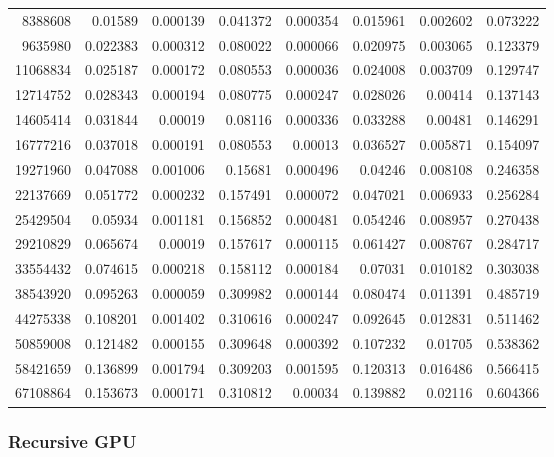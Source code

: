 \begin{longtable}{r r r r r r r r}
8388608 & 0.01589 & 0.000139 & 0.041372 & 0.000354 & 0.015961 & 0.002602 & 0.073222 \\
9635980 & 0.022383 & 0.000312 & 0.080022 & 0.000066 & 0.020975 & 0.003065 & 0.123379 \\
11068834 & 0.025187 & 0.000172 & 0.080553 & 0.000036 & 0.024008 & 0.003709 & 0.129747 \\
12714752 & 0.028343 & 0.000194 & 0.080775 & 0.000247 & 0.028026 & 0.00414 & 0.137143 \\
14605414 & 0.031844 & 0.00019 & 0.08116 & 0.000336 & 0.033288 & 0.00481 & 0.146291 \\
16777216 & 0.037018 & 0.000191 & 0.080553 & 0.00013 & 0.036527 & 0.005871 & 0.154097 \\
19271960 & 0.047088 & 0.001006 & 0.15681 & 0.000496 & 0.04246 & 0.008108 & 0.246358 \\
22137669 & 0.051772 & 0.000232 & 0.157491 & 0.000072 & 0.047021 & 0.006933 & 0.256284 \\
25429504 & 0.05934 & 0.001181 & 0.156852 & 0.000481 & 0.054246 & 0.008957 & 0.270438 \\
29210829 & 0.065674 & 0.00019 & 0.157617 & 0.000115 & 0.061427 & 0.008767 & 0.284717 \\
33554432 & 0.074615 & 0.000218 & 0.158112 & 0.000184 & 0.07031 & 0.010182 & 0.303038 \\
38543920 & 0.095263 & 0.000059 & 0.309982 & 0.000144 & 0.080474 & 0.011391 & 0.485719 \\
44275338 & 0.108201 & 0.001402 & 0.310616 & 0.000247 & 0.092645 & 0.012831 & 0.511462 \\
50859008 & 0.121482 & 0.000155 & 0.309648 & 0.000392 & 0.107232 & 0.01705 & 0.538362 \\
58421659 & 0.136899 & 0.001794 & 0.309203 & 0.001595 & 0.120313 & 0.016486 & 0.566415 \\
67108864 & 0.153673 & 0.000171 & 0.310812 & 0.00034 & 0.139882 & 0.02116 & 0.604366 \\
\end{longtable}

\subsubsection{Recursive GPU}

